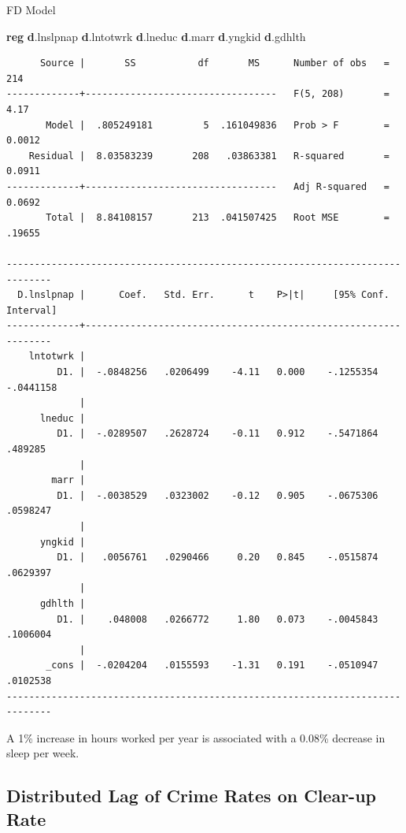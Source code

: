 \documentclass[
]{book}
\newenvironment{Shaded}{\begin{snugshade}}{\end{snugshade}}
\newcommand{\KeywordTok}[1]{\textcolor[rgb]{0.13,0.29,0.53}{\textbf{#1}}}
\newcommand{\NormalTok}[1]{#1}
\begin{document}
FD Model

\begin{Shaded}
\begin{Highlighting}[]
\KeywordTok{reg} \KeywordTok{d}\NormalTok{.lnslpnap }\KeywordTok{d}\NormalTok{.lntotwrk }\KeywordTok{d}\NormalTok{.lneduc }\KeywordTok{d}\NormalTok{.marr }\KeywordTok{d}\NormalTok{.yngkid }\KeywordTok{d}\NormalTok{.gdhlth}
\end{Highlighting}
\end{Shaded}

\begin{verbatim}
      Source |       SS           df       MS      Number of obs   =       214
-------------+----------------------------------   F(5, 208)       =      4.17
       Model |  .805249181         5  .161049836   Prob > F        =    0.0012
    Residual |  8.03583239       208   .03863381   R-squared       =    0.0911
-------------+----------------------------------   Adj R-squared   =    0.0692
       Total |  8.84108157       213  .041507425   Root MSE        =    .19655

------------------------------------------------------------------------------
  D.lnslpnap |      Coef.   Std. Err.      t    P>|t|     [95% Conf. Interval]
-------------+----------------------------------------------------------------
    lntotwrk |
         D1. |  -.0848256   .0206499    -4.11   0.000    -.1255354   -.0441158
             |
      lneduc |
         D1. |  -.0289507   .2628724    -0.11   0.912    -.5471864     .489285
             |
        marr |
         D1. |  -.0038529   .0323002    -0.12   0.905    -.0675306    .0598247
             |
      yngkid |
         D1. |   .0056761   .0290466     0.20   0.845    -.0515874    .0629397
             |
      gdhlth |
         D1. |    .048008   .0266772     1.80   0.073    -.0045843    .1006004
             |
       _cons |  -.0204204   .0155593    -1.31   0.191    -.0510947    .0102538
------------------------------------------------------------------------------
\end{verbatim}

A 1\% increase in hours worked per year is associated with a 0.08\% decrease in sleep per week.

\subsection{Distributed Lag of Crime Rates on Clear-up Rate}\label{distributed-lag-of-crime-rates-on-clear-up-rate}
\end{document}
